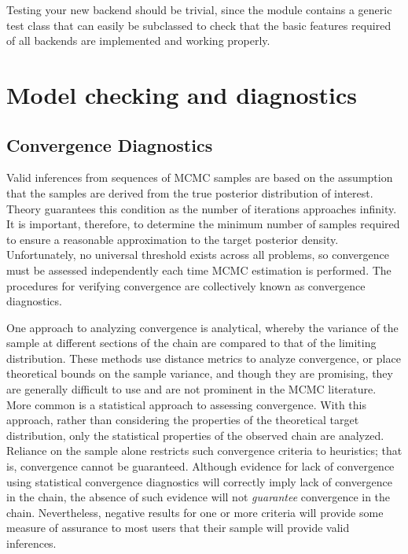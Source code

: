 \documentclass[letterpaper,10pt,english]{sphinxmanual}
\begin{document}
Testing your new backend should be trivial, since the  module contains a generic test class that can easily be subclassed to check that the basic features required of all backends are implemented and working properly.


\chapter{Model checking and diagnostics}
\label{modelchecking:chap-modelchecking}\label{modelchecking:model-checking-and-diagnostics}\label{modelchecking::doc}\label{modelchecking:pytables}

\section{Convergence Diagnostics}
\label{modelchecking:convergence-diagnostics}
Valid inferences from sequences of MCMC samples are based on the assumption that the samples are derived from the true posterior distribution of interest. Theory guarantees this condition as the number of iterations approaches infinity. It is important, therefore, to determine the minimum number of samples required to ensure a reasonable approximation to the target posterior density. Unfortunately, no universal threshold exists across all problems, so convergence must be assessed independently each time MCMC estimation is performed. The procedures for verifying convergence are collectively known as convergence diagnostics.

One approach to analyzing convergence is analytical, whereby the variance of the sample at different sections of the chain are compared to that of the limiting distribution. These methods use distance metrics to analyze convergence, or place theoretical bounds on the sample variance, and though they are promising, they are generally difficult to use and are not prominent in the MCMC literature. More common is a statistical approach to assessing convergence. With this approach, rather than considering the properties of the theoretical target distribution, only the statistical properties of the observed chain are analyzed. Reliance on the sample alone restricts such convergence criteria to heuristics; that is, convergence cannot be guaranteed. Although evidence for lack of convergence using statistical convergence diagnostics will correctly imply lack of convergence in the chain, the absence of such evidence will not \emph{guarantee} convergence in the chain. Nevertheless, negative results for one or more criteria will provide some measure of assurance to most users that their sample will provide valid inferences.
\end{document}
